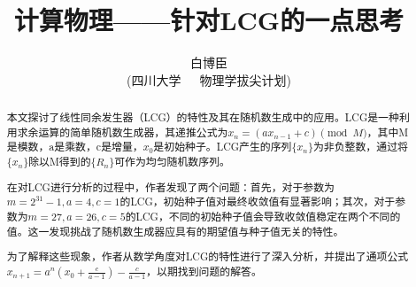 \documentclass[12pt,a4paper]{article}%
\title{\fontsize{18pt}{27pt}\selectfont%
{\heiti%
计算物理——针对LCG的一点思考}}%
\author{\fontsize{12pt}{18pt}\selectfont%
{\fangsong%
白博臣}\\%
\fontsize{10.5pt}{15.75pt}\selectfont%
{\fangsong%
(四川大学~~~物理学拔尖计划)}}%
\date{}%
\begin{document}
    \maketitle%
    \lhead{}%
    \chead{}%
    \rhead{}%
    \lfoot{}%
    \cfoot{\thepage}%
    \rfoot{}%
    \begin{abstract}
        \fangsong
        本文探讨了线性同余发生器（LCG）的特性及其在随机数生成中的应用。LCG是一种利用求余运算的简单随机数生成器，其递推公式为$x_n = (ax_{n-1}+c) \pmod{M}$，其中M是模数，a是乘数，c是增量，$x_0$是初始种子。LCG产生的序列$\{x_n\}$为非负整数，通过将$\{x_n\}$除以M得到的$\{R_n\}$可作为均匀随机数序列。

        在对LCG进行分析的过程中，作者发现了两个问题：首先，对于参数为$m=2^{31}-1,a=4,c=1$的LCG，初始种子值对最终收敛值有显著影响；其次，对于参数为$m=27,a=26,c=5$的LCG，不同的初始种子值会导致收敛值稳定在两个不同的值。这一发现挑战了随机数生成器应具有的期望值与种子值无关的特性。

        为了解释这些现象，作者从数学角度对LCG的特性进行了深入分析，并提出了通项公式$x_{n+1}=a^n(x_0+\frac{c}{a-1})-\frac{c}{a-1}$，以期找到问题的解答。


    \end{abstract}

    \begin{adjustwidth}{1.06cm}{1.06cm}
        \fontsize{10.5pt}{15.75pt}\\
    \end{adjustwidth}

    \newpage%
\end{document}
